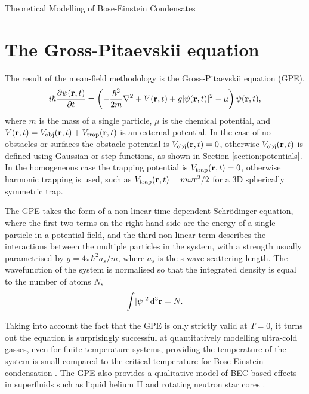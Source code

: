 \begin{chapter}{\label{cha:theoretical_model}Theoretical Modelling of Bose-Einstein Condensates}
\section{\label{section:gpe} The Gross-Pitaevskii equation}
The result of the mean-field methodology is the Gross-Pitaevskii equation (GPE), 
\begin{equation}
i \hbar \frac{\partial\psi({\bf r},t)}{\partial t} = \left(-\frac{\hbar^2}{2m}\nabla^2 + V({\bf r},t) + g|\psi({\bf r},t)|^2 - \mu \right) \psi({\bf r},t),
\label{eq:gpe}
\end{equation}
where $m$ is the mass of a single particle, $\mu$ is the chemical potential, and $V({\bf r},t) = V_{\mathrm{obj}}({\bf r},t) + V_{\mathrm{trap}}({\bf r},t)$ is an external potential. In the case of no obstacles or surfaces the obstacle potential is $V_{\mathrm{obj}}({\bf r},t)=0$, otherwise $V_{\mathrm{obj}}({\bf r},t)$ is defined using Gaussian or step functions, as shown in Section \ref{section:potentials}. In the homogeneous case the trapping potential is $V_{\mathrm{trap}}({\bf r},t)=0$, otherwise harmonic trapping is used, such as $V_{\mathrm{trap}}({\bf r},t)=m\omega{\bf r}^2/2$ for a 3D spherically symmetric trap.

The GPE takes the form of a non-linear time-dependent Schr\"odinger equation, where the first two terms on the right hand side are the energy of a single particle in a potential field, and the third non-linear term describes the interactions between the multiple particles in the system, with a strength usually parametrised by $g=4\pi\hbar^2a_s/m$,
where $a_s$ is the s-wave scattering length. The wavefunction of the system is normalised so that the integrated density is equal to the number of atoms $N$,
\begin{equation}
\int\!|\psi|^2\,{\rm d}^3{\bf r} = N.
\label{eq:normalisewf}
\end{equation}

Taking into account the fact that the GPE is only strictly valid at $T=0$, it turns out the equation is surprisingly successful at quantitatively modelling ultra-cold gasses, %
even for finite temperature systems, providing the temperature of the system is small compared to the critical temperature for Bose-Einstein condensation \cite{Proukakis}.
The GPE also provides a qualitative model of BEC based effects in superfluids such as liquid helium II \cite{RobertsBerloff} and rotating neutron star cores \cite{Warszawski01082011}.


\end{chapter}
